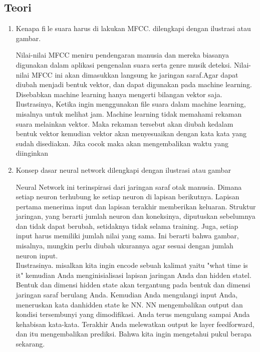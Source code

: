 \subsection{Teori}
\begin{enumerate}
\item Kenapa file suara harus di lakukan MFCC. dilengkapi dengan ilustrasi atau gambar. \\
\par Nilai-nilai MFCC meniru pendengaran manusia dan mereka biasanya digunakan dalam aplikasi pengenalan suara serta genre musik
deteksi. Nilai-nilai MFCC ini akan dimasukkan langsung ke jaringan saraf.Agar dapat diubah menjadi bentuk vektor, dan dapat digunakan pada machine learning. Disebabkan machine learning hanya mengerti bilangan vektor saja.\\
Ilustrasinya, Ketika ingin menggunakan file suara dalam machine learning, misalnya untuk melihat jam. Machine learning tidak memahami rekaman suara melainkan vektor. Maka rekaman tersebut akan diubah kedalam bentuk vektor kemudian vektor akan menyesuaikan dengan kata kata yang sudah disediakan. Jika cocok maka akan mengembalikan waktu yang diinginkan

\item Konsep dasar neural network dilengkapi dengan ilustrasi atau gambar
\par Neural Network ini terinspirasi dari jaringan saraf otak manusia. Dimana setiap neuron terhubung ke setiap neuron di lapisan berikutnya. Lapisan pertama menerima input dan lapisan terakhir memberikan keluaran. Struktur jaringan, yang berarti jumlah neuron dan koneksinya, diputuskan sebelumnya dan tidak dapat berubah, setidaknya tidak selama training. Juga, setiap input harus memiliki jumlah nilai yang sama. Ini berarti bahwa gambar, misalnya, mungkin perlu diubah ukurannya agar sesuai dengan jumlah neuron input.\\

Ilustrasinya. misalkan kita ingin encode sebuah kalimat yaitu "what time is it" kemudian Anda menginisialisasi lapisan jaringan Anda dan hidden statel. Bentuk dan dimensi hidden state akan tergantung pada bentuk dan dimensi jaringan saraf berulang Anda. Kemudian Anda mengulangi input Anda, meneruskan kata danhidden state ke NN. NN mengembalikan output dan kondisi tersembunyi yang dimodifikasi. Anda terus mengulang sampai Anda kehabisan kata-kata. Terakhir Anda melewatkan output ke layer feedforward, dan itu mengembalikan prediksi. Bahwa kita ingin mengetahui pukul berapa sekarang.


\end{enumerate}
